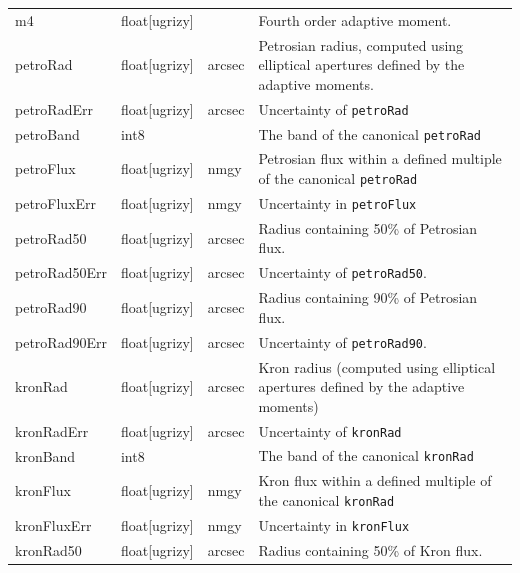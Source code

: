 \documentclass[12pt]{article}
\begin{document}
\begin{center}
\begin{longtable}{p{3cm}p{2cm}p{2cm}p{5cm}}
m4 & float[ugrizy] & ~ & Fourth order adaptive moment. \\


petroRad & float[ugrizy] & arcsec & Petrosian radius, computed using elliptical apertures defined by the adaptive moments. \\

petroRadErr & float[ugrizy] & arcsec & Uncertainty of \texttt{petroRad} \\

petroBand & int8 & ~ & The band of the canonical \texttt{petroRad} \\

petroFlux & float[ugrizy] & nmgy & Petrosian flux within a defined multiple of the canonical \texttt{petroRad} \\

petroFluxErr & float[ugrizy] & nmgy & Uncertainty in \texttt{petroFlux} \\

petroRad50 & float[ugrizy] & arcsec & Radius containing 50\% of Petrosian flux. \\

petroRad50Err & float[ugrizy] & arcsec & Uncertainty of \texttt{petroRad50}. \\

petroRad90 & float[ugrizy] & arcsec & Radius containing 90\% of Petrosian flux. \\

petroRad90Err & float[ugrizy] & arcsec & Uncertainty of \texttt{petroRad90}. \\


kronRad & float[ugrizy] & arcsec & Kron radius (computed using elliptical apertures defined by the adaptive moments) \\

kronRadErr & float[ugrizy] & arcsec & Uncertainty of \texttt{kronRad} \\

kronBand & int8 & ~ & The band of the canonical \texttt{kronRad} \\

kronFlux & float[ugrizy] & nmgy & Kron flux within a defined multiple of the canonical \texttt{kronRad} \\

kronFluxErr & float[ugrizy] & nmgy & Uncertainty in \texttt{kronFlux} \\

kronRad50 & float[ugrizy] & arcsec & Radius containing 50\% of Kron flux. \\


\end{longtable}
\end{center}
\end{document}
